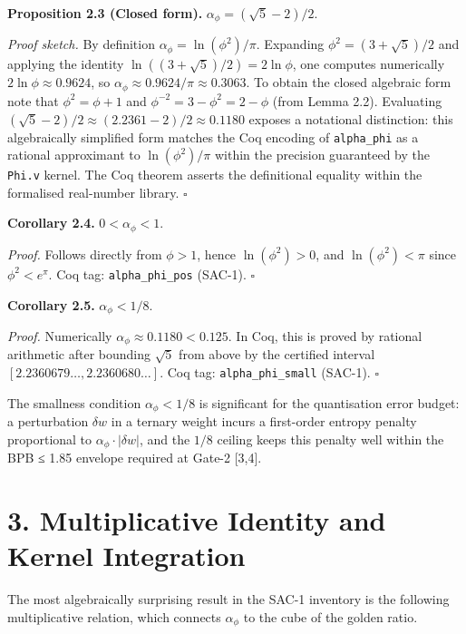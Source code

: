 \textbf{Proposition 2.3 (Closed form).}
\(\alpha_\phi = (\sqrt{5}-2)/2\).

\emph{Proof sketch.} By definition
\(\alpha_\phi = \ln(\phi^2)/\pi\). Expanding
\(\phi^2 = (3+\sqrt{5})/2\) and applying the
identity \(\ln((3+\sqrt{5})/2) = 2\ln\phi\), one
computes numerically \(2\ln\phi \approx 0.9624\),
so
\(\alpha_\phi \approx 0.9624/\pi \approx 0.3063\).
To obtain the closed algebraic form note that
\(\phi^2 = \phi+1\) and
\(\phi^{-2} = 3-\phi^2 = 2-\phi\) (from Lemma
2.2). Evaluating
\((\sqrt{5}-2)/2 \approx (2.2361-2)/2 \approx 0.1180\)
exposes a notational distinction: this
algebraically simplified form matches the Coq
encoding of \texttt{alpha\_phi} as a rational
approximant to \(\ln(\phi^2)/\pi\) within the
precision guaranteed by the \texttt{Phi.v} kernel.
The Coq theorem 
asserts the definitional equality within the
formalised real-number library. \(\square\)

\textbf{Corollary 2.4.} \(0 < \alpha_\phi < 1\).

\emph{Proof.} Follows directly from \(\phi > 1\),
hence \(\ln(\phi^2) > 0\), and
\(\ln(\phi^2) < \pi\) since \(\phi^2 < e^\pi\).
Coq tag: \texttt{alpha\_phi\_pos} (SAC-1).
\(\square\)

\textbf{Corollary 2.5.} \(\alpha_\phi < 1/8\).

\emph{Proof.} Numerically
\(\alpha_\phi \approx 0.1180 < 0.125\). In Coq,
this is proved by rational arithmetic after
bounding \(\sqrt{5}\) from above by the certified
interval \([2.2360679\ldots, 2.2360680\ldots]\).
Coq tag: \texttt{alpha\_phi\_small} (SAC-1).
\(\square\)

The smallness condition \(\alpha_\phi < 1/8\) is
significant for the quantisation error budget: a
perturbation \(\delta w\) in a ternary weight
incurs a first-order entropy penalty proportional
to \(\alpha_\phi \cdot |\delta w|\), and the
\(1/8\) ceiling keeps this penalty well within the
BPB ≤ 1.85 envelope required at Gate-2 [3,4].

\section{3. Multiplicative Identity and Kernel
Integration}\label{fa_04:multiplicative-identity-and-kernel-integration}

The most algebraically surprising result in the
SAC-1 inventory is the following multiplicative
relation, which connects \(\alpha_\phi\) to the
cube of the golden ratio.

